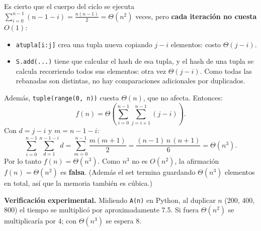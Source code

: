 \documentclass[11pt]{article}
\begin{document}
Es cierto que el cuerpo del ciclo se ejecuta $\sum_{i=0}^{n-1}(n-1-i) = \frac{n(n-1)}{2} = \Theta(n^2)$ veces, pero \textbf{cada iteración no cuesta $O(1)$}:
\begin{itemize}
  \item \texttt{atupla[i:j]} crea una tupla nueva copiando $j-i$ elementos: costo $\Theta(j-i)$.
  \item \texttt{S.add(...)} tiene que calcular el hash de esa tupla, y el hash de una tupla se calcula recorriendo todos sus elementos: otra vez $\Theta(j-i)$. Como todas las rebanadas son distintas, no hay comparaciones adicionales por duplicados.
\end{itemize}
Además, \texttt{tuple(range(0, n))} cuesta $\Theta(n)$, que no afecta. Entonces:
\[
f(n) = \Theta\!\left(\sum_{i=0}^{n-1}\sum_{j=i+1}^{n-1}(j-i)\right).
\]
Con $d = j - i$ y $m = n-1-i$:
\[
\sum_{i=0}^{n-1}\sum_{d=1}^{n-1-i} d = \sum_{m=0}^{n-1}\frac{m(m+1)}{2} = \frac{(n-1)\,n\,(n+1)}{6} = \Theta(n^3).
\]
Por lo tanto $f(n) = \Theta(n^3)$. Como $n^3$ no es $O(n^2)$, la afirmación $f(n) = \Theta(n^2)$ es \textbf{falsa}. (Además el set termina guardando $\Theta(n^3)$ elementos en total, así que la memoria también es cúbica.)

\textbf{Verificación experimental.} Midiendo \texttt{A(n)} en Python, al duplicar $n$ (200, 400, 800) el tiempo se multiplicó por aproximadamente 7.5. Si fuera $\Theta(n^2)$ se multiplicaría por 4; con $\Theta(n^3)$ se espera 8.
\end{document}
